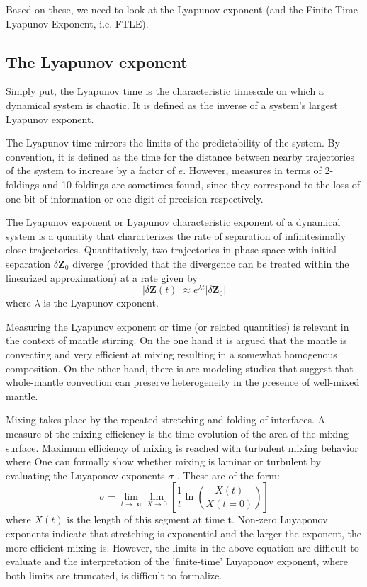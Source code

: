 Based on these, we need to look at the Lyapunov exponent (and the 
Finite Time Lyapunov Exponent, i.e. FTLE).

\subsection{The Lyapunov exponent}


Simply put, the Lyapunov time is the characteristic timescale on which a dynamical system is chaotic.
 It is defined as the inverse of a system's largest Lyapunov exponent.

The Lyapunov time mirrors the limits of the predictability of the system. By convention, it is defined 
as the time for the distance between nearby trajectories of the system to increase by a factor of $e$. 
However, measures in terms of 2-foldings and 10-foldings are sometimes found, since they correspond to 
the loss of one bit of information or one digit of precision respectively.

The Lyapunov exponent or Lyapunov characteristic exponent of a dynamical system is a quantity 
that characterizes the rate of separation of infinitesimally close trajectories. 
Quantitatively, two trajectories in phase space with initial separation $\delta \mathbf{Z}_0$ 
diverge (provided that the divergence can be treated within the linearized approximation) at a rate given by
\[
|\delta \mathbf{Z} (t)|\approx e^{\lambda t}|\delta \mathbf {Z} _{0}| 
\]
where $\lambda$ is the Lyapunov exponent. 

Measuring the Lyapunov exponent or time (or related quantities) is relevant in the context of mantle stirring. 
On the one hand it is argued that the mantle is convecting and very efficient at mixing resulting in a 
somewhat homogenous composition. On the other hand, there is are modeling studies that suggest that
whole-mantle convection can preserve heterogeneity in the presence of well-mixed mantle. 

Mixing takes place by the repeated stretching
and folding of interfaces. A measure of the
mixing efficiency is the time evolution of the area of
the mixing surface. Maximum efficiency of mixing
is reached with turbulent mixing behavior where
One can formally show whether mixing is laminar or turbulent by evaluating the Luyaponov exponents $\sigma$ .
These are of the form:
\[
\sigma = \lim_{t\rightarrow \infty} \lim_{X\rightarrow 0} \left[  \frac{1}{t} \ln \left( \frac{X(t)}{X(t=0)} \right)   \right]
\]
where $X(t)$ is the length of this segment at time t.
Non-zero Luyaponov exponents indicate that
stretching is exponential and the larger the exponent,
the more efficient mixing is.
However, the limits in the above equation are difficult to evaluate and the interpretation 
of the 'finite-time' Luyaponov exponent, where both limits are truncated, is difficult to formalize.


